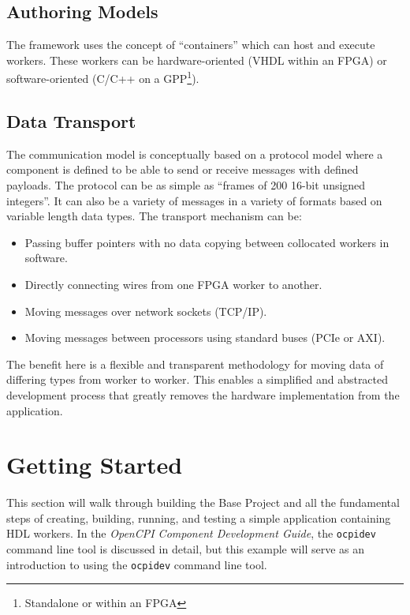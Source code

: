 \subsection{Authoring Models}
\label{subsec:Authoring_Models}
The framework uses the concept of ``containers'' which can host and execute workers. These workers can be hardware-oriented (VHDL within an FPGA) or software-oriented (C/C++ on a GPP\footnote{Standalone or within an FPGA}).

\subsection{Data Transport}
\label{subsec:Data_Transport}
The communication model is conceptually based on a protocol model where a component is defined to be able to send or receive messages
with defined payloads. The protocol can be as simple as ``frames of 200 16-bit unsigned integers''. It can also be a variety of messages in a variety of formats based on variable length data types. The transport mechanism can be:
\begin{itemize}
\item Passing buffer pointers with no data copying between collocated workers in software.
\item Directly connecting wires from one FPGA worker to another.
\item Moving messages over network sockets (TCP/IP).
\item Moving messages between processors using standard buses (PCIe or AXI).
\end{itemize}

The benefit here is a flexible and transparent methodology for moving data of differing types from worker to worker. This enables a simplified and abstracted development process that greatly removes the hardware implementation from the application.

\newpage
\section{Getting Started}
This section will walk through building the Base Project and all the fundamental steps of creating, building, running, and testing a simple application containing HDL workers. In the \textit{OpenCPI Component Development Guide}, the \verb+ocpidev+ command line tool is discussed in detail, but this example will serve as an introduction to using the \verb+ocpidev+ command line tool.

